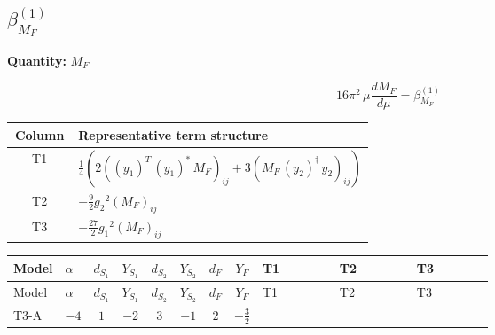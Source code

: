 \documentclass[8pt]{article}
\begin{document}
\begin{landscape}
\section*{$\beta_{M_F}^{(1)}$}
\noindent\textbf{Quantity: }$M_F$\par\smallskip
\[16\pi^2\,\mu\frac{d M_F}{d\mu}=\beta_{M_F}^{(1)}\]
\begin{center}
\begin{tabular}{@{}c >{\raggedright\arraybackslash}p{0.82\linewidth}@{}}
\toprule
Column & Representative term structure \\
\midrule
T1 & \(\displaystyle \frac{1}{4} (2 \left(\left({y_1}\right)^{T}\,\left({y_1}\right)^{*}\,{M_F}\right)_{ij}+3 \left({M_F}\,\left({y_2}\right)^{\dagger}\,{y_2}\right)_{ij})\) \\
\midrule
T2 & \(\displaystyle -\frac{9}{2} {g_2}^2 \left({M_F}\right)_{ij}\) \\
\midrule
T3 & \(\displaystyle -\frac{27}{2} {g_1}^2 \left({M_F}\right)_{ij}\) \\
\midrule
\bottomrule
\end{tabular}
\end{center}
\smallskip
\tiny
\begin{longtable}{@{}llcccccc >{\raggedright\arraybackslash}p{0.21\linewidth} >{\raggedright\arraybackslash}p{0.21\linewidth} >{\raggedright\arraybackslash}p{0.21\linewidth}@{}}
\toprule
Model & $\alpha$ & $d_{S_1}$ & $Y_{S_1}$ & $d_{S_2}$ & $Y_{S_2}$ & $d_F$ & $Y_F$ & T1 & T2 & T3 \\
\midrule
\endfirsthead
\toprule
Model & $\alpha$ & $d_{S_1}$ & $Y_{S_1}$ & $d_{S_2}$ & $Y_{S_2}$ & $d_F$ & $Y_F$ & T1 & T2 & T3 \\
\midrule
\endhead
T3-A & $-4$ & $1$ & $-2$ & $3$ & $-1$ & $2$ & $-\frac{3}{2}$ & \scriptsize\adjustbox{max width=\linewidth}{$\begin{gathered} \frac{1}{4} (2 \left(\left({y_1}\right)^{T}\,\left({y_1}\right)^{*}\,{M_F}\right)_{ij}+3 \left({M_F}\,\left({y_2}\right)^{\dagger}\,{y_2}\right)_{ij})\end{gathered}$} & \scriptsize\adjustbox{max width=\linewidth}{$\begin{gathered} -\frac{9}{2} {g_2}^2 \left({M_F}\right)_{ij}\end{gathered}$} & \scriptsize\adjustbox{max width=\linewidth}{$\begin{gathered} -\frac{27}{2} {g_1}^2 \left({M_F}\right)_{ij}\end{gathered}$} \\
\midrule
\bottomrule
\end{longtable}
\clearpage

\end{landscape}
\end{document}
